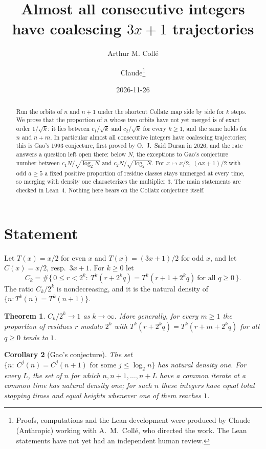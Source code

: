 \documentclass[11pt]{article}
\title{Almost all consecutive integers have coalescing $3x+1$ trajectories}
\author{Arthur M. Coll\'e \and Claude\thanks{Proofs, computations and the Lean development were produced by Claude (Anthropic) working with A.~M.~Coll\'e, who directed the work. The Lean statements have not yet had an independent human review.}}
\date{2026-11-26}
\newtheorem{theorem}{Theorem}
\newtheorem{corollary}[theorem]{Corollary}
\theoremstyle{remark}
\begin{document}
\maketitle

\begin{abstract}
Run the orbits of $n$ and $n+1$ under the shortcut Collatz map side by side for $k$ steps. We prove
that the proportion of $n$ whose two orbits have not yet merged is of exact order $1/\sqrt k$: it
lies between $c_1/\sqrt k$ and $c_2/\sqrt k$ for every $k\ge1$, and the same holds for $n$ and
$n+m$. In particular almost all consecutive integers have coalescing trajectories; this is Gao's
1993 conjecture, first proved by O.~J.~Said Duran in 2026, and the rate answers a question left
open there: below $N$, the exceptions to Gao's conjecture number between $c_1N/\sqrt{\log_2N}$
and $c_2N/\sqrt{\log_2N}$. For $x\mapsto x/2,\ (ax+1)/2$ with odd $a\ge5$ a fixed positive
proportion of residue classes stays unmerged at every time, so merging with density one
characterizes the multiplier $3$. The main
statements are checked in Lean~4. Nothing here bears on the Collatz conjecture itself.
\end{abstract}

\section{Statement}
Let $T(x)=x/2$ for even $x$ and $T(x)=(3x+1)/2$ for odd $x$, and let $C(x)=x/2$, resp.\ $3x+1$.
For $k\ge0$ let
\[
C_k=\#\{\,0\le r<2^k:\ T^k(r+2^kq)=T^k(r+1+2^kq)\ \text{for all } q\ge0\,\}.
\]
The ratio $C_k/2^k$ is nondecreasing, and it is the natural density of
$\{n: T^k(n)=T^k(n+1)\}$.

\begin{theorem}\label{main}
$C_k/2^k\to1$ as $k\to\infty$. More generally, for every $m\ge1$ the proportion of residues $r$
modulo $2^k$ with $T^k(r+2^kq)=T^k(r+m+2^kq)$ for all $q\ge 0$ tends to $1$.
\end{theorem}

\begin{corollary}[Gao's conjecture]\label{gao}
The set $\{n:\ C^{j}(n)=C^{j}(n+1)\text{ for some } j\le\log_2 n\}$ has natural density one.
For every $L$, the set of $n$ for which $n,n+1,\dots,n+L$ have a common iterate at a common time
has natural density one; for such $n$ these integers have equal total stopping times and equal
heights whenever one of them reaches $1$.
\end{corollary}
\end{document}
